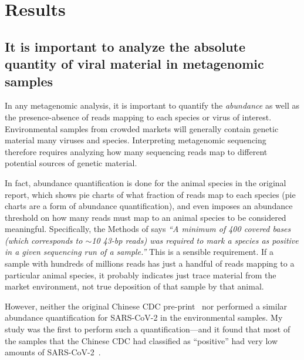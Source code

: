 \documentclass[9pt,onecolumn,twoside]{gsajnl_modified}
\begin{document}
\section{Results}

\subsection{It is important to analyze the absolute quantity of viral material in metagenomic samples}
In any metagenomic analysis, it is important to quantify the \emph{abundance} as well as the presence-absence of reads mapping to each species or virus of interest.
Environmental samples from crowded markets will generally contain genetic material many viruses and species.
Interpreting metagenomic sequencing therefore requires analyzing how many sequencing reads map to different potential sources of genetic material.

In fact, abundance quantification is done for the animal species in the original \citet{crits2023genetic} report, which shows pie charts of what fraction of reads map to each species (pie charts are a form of abundance quantification), and even imposes an abundance threshold on how many reads must map to an animal species to be considered meaningful.
Specifically, the Methods of \citet{crits2023genetic} says \textit{``A minimum of 400 covered bases (which corresponds to $\sim$10 43-bp reads) was required to mark a species as positive in a given sequencing run of a sample.''}
This is a sensible requirement.
If a sample with hundreds of millions reads has just a handful of reads mapping to a particular animal species, it probably indicates just trace material from the market environment, not true deposition of that sample by that animal.

However, neither the original Chinese CDC pre-print~\citep{liu2022surveillance} nor \citet{crits2023genetic} performed a similar abundance quantification for SARS-CoV-2 in the environmental samples.
My study was the first to perform such a quantification---and it found that most of the samples that the Chinese CDC had classified as ``positive''  had very low amounts of SARS-CoV-2~\citep{bloom2023association}.
\end{document}
